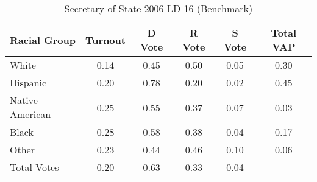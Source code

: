 \begin{table}[htb]
\begin{center}
\caption{Secretary of State 2006 LD 16 (Benchmark)}
\label{sos06_vap_ld_16_benchmark}
\begin{tabular}{lccccc}
  \hline
Racial Group & Turnout & D Vote & R Vote & S Vote & Total VAP \\ 
  \hline
White & 0.14 & 0.45 & 0.50 & 0.05 & 0.30 \\ 
  Hispanic & 0.20 & 0.78 & 0.20 & 0.02 & 0.45 \\ 
  Native American & 0.25 & 0.55 & 0.37 & 0.07 & 0.03 \\ 
  Black & 0.28 & 0.58 & 0.38 & 0.04 & 0.17 \\ 
  Other & 0.23 & 0.44 & 0.46 & 0.10 & 0.06 \\ 
  Total Votes & 0.20 & 0.63 & 0.33 & 0.04 &  \\ 
   \hline
\end{tabular}
\end{center}
\end{table}
